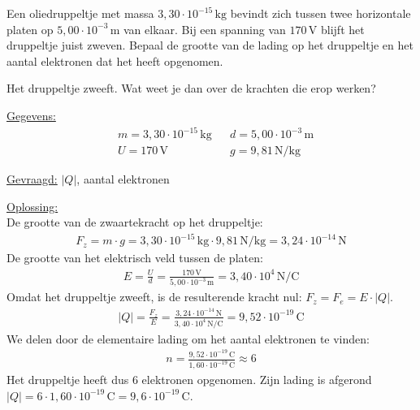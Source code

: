 \documentclass{ximera}
\begin{document}
\begin{example}[foldable=true,title={Voorbeeld: lading van een oliedruppeltje}]\nl
Een oliedruppeltje met massa $3{,}30 \cdot 10^{-15} \, \mathrm{kg}$ bevindt zich tussen twee horizontale platen op $5{,}00 \cdot 10^{-3} \, \mathrm{m}$ van elkaar. Bij een spanning van $170 \, \mathrm{V}$ blijft het druppeltje juist zweven. Bepaal de grootte van de lading op het druppeltje en het aantal elektronen dat het heeft opgenomen.

\begin{hint}
    Het druppeltje zweeft. Wat weet je dan over de krachten die erop werken?
\end{hint}

\begin{solution}\nl
\underline{Gegevens:}
\begin{align*}
    & m = 3{,}30 \cdot 10^{-15} \, \mathrm{kg} & & d = 5{,}00 \cdot 10^{-3} \, \mathrm{m} \\
    & U = 170 \, \mathrm{V} & & g = 9{,}81 \, \mathrm{N/kg}
\end{align*}

\underline{Gevraagd:} $\lvert Q \rvert$, aantal elektronen

\underline{Oplossing:}\\
De grootte van de zwaartekracht op het druppeltje:
\begin{align*}
    F_{z} = m \cdot g = 3{,}30 \cdot 10^{-15} \, \mathrm{kg} \cdot 9{,}81 \, \mathrm{N/kg} = 3{,}24 \cdot 10^{-14} \, \mathrm{N}
\end{align*}
De grootte van het elektrisch veld tussen de platen:
\begin{align*}
    E = \frac{U}{d} = \frac{170 \, \mathrm{V}}{5{,}00 \cdot 10^{-3} \, \mathrm{m}} = 3{,}40 \cdot 10^{4} \, \mathrm{N/C}
\end{align*}
Omdat het druppeltje zweeft, is de resulterende kracht nul: $F_{z} = F_{e} = E \cdot \lvert Q \rvert$.
\begin{align*}
    \lvert Q \rvert = \frac{F_{z}}{E} = \frac{3{,}24 \cdot 10^{-14} \, \mathrm{N}}{3{,}40 \cdot 10^{4} \, \mathrm{N/C}} = 9{,}52 \cdot 10^{-19} \, \mathrm{C}
\end{align*}
We delen door de elementaire lading om het aantal elektronen te vinden:
\begin{align*}
    n = \frac{9{,}52 \cdot 10^{-19} \, \mathrm{C}}{1{,}60 \cdot 10^{-19} \, \mathrm{C}} \approx \boxed{6}
\end{align*}
Het druppeltje heeft dus $6$ elektronen opgenomen. Zijn lading is afgerond $\lvert Q \rvert = 6 \cdot 1{,}60 \cdot 10^{-19} \, \mathrm{C} = 9{,}6 \cdot 10^{-19} \, \mathrm{C}$.
\end{solution}
\end{example}
\end{document}
